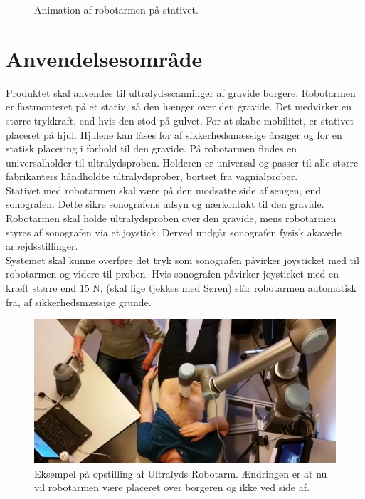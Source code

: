 \begin{figure}[H]
\begin{minipage}{0.55\textwidth}
		\caption{Animation af robotarmen på stativet.}
		\label{Robotstativ}
	\end{minipage}
\end{figure}

\section{Anvendelsesområde}
Produktet skal anvendes til ultralydsscanninger af gravide borgere. Robotarmen er fastmonteret på et stativ, så den hænger over den gravide. Det medvirker en større trykkraft, end hvis den stod på gulvet. For at skabe mobilitet, er stativet placeret på hjul. Hjulene kan låses for af sikkerhedsmæssige årsager og for en statisk placering i forhold til den gravide. På robotarmen findes en universalholder til ultralydsproben. Holderen er universal og passer til alle større fabrikanters håndholdte ultralydsprober, bortset fra vagnialprober.\\

Stativet med robotarmen skal være på den modsatte side af sengen, end sonografen. Dette sikre sonografens udsyn og nærkontakt til den gravide.
Robotarmen skal holde ultralydsproben over den gravide, mens robotarmen styres af sonografen via et joystick. Derved undgår sonografen fysisk akavede arbejdsstillinger. \\
Systemet skal kunne overføre det tryk som sonografen påvirker joysticket med til robotarmen og videre til proben.
Hvis sonografen påvirker joysticket med en kræft større end 15 N, (skal lige tjekkes med Søren) slår robotarmen automatisk fra, af sikkerhedsmæssige grunde. 

\begin{figure}[H]\centering
	\includegraphics[width = 1.0\textwidth]{Figurer/ergonomiskLosning.jpg}
	\caption{Eksempel på opstilling af Ultralyds Robotarm. Ændringen er at nu vil robotarmen være placeret over borgeren og ikke ved side af. }
	\label{ergonomiskLosning}
\end{figure}

